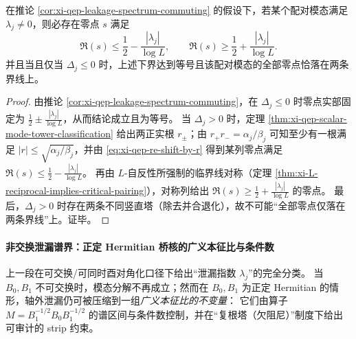 \begin{corollary}[泄漏的不可消除下界]\label{cor:xi-qep-leakage-lower-bound}
在推论 \ref{cor:xi-qep-leakage-spectrum-commuting} 的假设下，若某个配对模态满足 \(\lambda_j\neq 0\)，则必存在零点 \(s\) 满足
\[
\Re(s)\le \frac12-\frac{|\lambda_j|}{\log L},
\qquad
\Re(s)\ge \frac12+\frac{|\lambda_j|}{\log L}.
\]
并且当且仅当 \(\Delta_j\le 0\) 时，上述下界达到等号且该配对模态的全部零点恰落在两条界线上。
\end{corollary}

\begin{proof}
由推论 \ref{cor:xi-qep-leakage-spectrum-commuting}，在 \(\Delta_j\le 0\) 时零点实部固定为 \(\frac12\pm\frac{|\lambda_j|}{\log L}\)，从而结论成立且为等号。
当 \(\Delta_j>0\) 时，定理 \ref{thm:xi-qep-scalar-mode-tower-classification} 给出两正实根 \(r_{\pm}\)；由 \(r_{+}r_{-}=\alpha_j/\beta_j\) 可知至少有一根满足 \(|r|\le \sqrt{\alpha_j/\beta_j}\)，并由 \eqref{eq:xi-qep-re-shift-by-r} 得到某列零点满足 \(\Re(s)\le \frac12-\frac{|\lambda_j|}{\log L}\)。
再由 \(L\)-自反性所强制的临界线对称（定理 \ref{thm:xi-L-reciprocal-implies-critical-pairing}），对称列给出 \(\Re(s)\ge \frac12+\frac{|\lambda_j|}{\log L}\) 的零点。
最后，\(\Delta_j>0\) 时存在两条不同竖直塔（除去并合退化），故不可能“全部零点仅落在两条界线”上。证毕。
\end{proof}

\paragraph{非交换泄漏谱界：正定 Hermitian 桥核的广义本征比与条件数}
上一段在可交换/可同时酉对角化口径下给出“泄漏指数 \(\lambda_j\)”的完全分类。
当 \(B_0,B_1\) 不可交换时，模态分解不再成立；然而在 \(B_0,B_1\) 为正定 Hermitian 的情形，轴外泄漏仍可被压缩到一组\emph{广义本征比的不变量}：
它们由算子 \(M=B_1^{-1/2}B_0B_1^{-1/2}\) 的谱区间与条件数控制，并在“复根塔（欠阻尼）”制度下给出可审计的 strip 约束。

